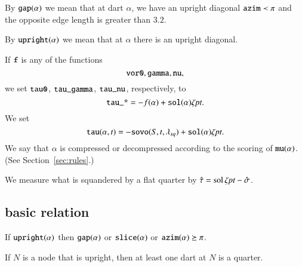 \begin{definition}[gap]
By ${\operatorname{{\texttt{gap}}}}(\alpha)$ we mean that at dart $\alpha$, we have an
upright diagonal ${\operatorname{{\texttt{azim}}}}\prec \pi$ and the opposite edge length
is greater than $3.2$.
\end{definition}

\begin{definition}[upright]
By ${\operatorname{{\texttt{upright}}}}(\alpha)$ we mean that at $\alpha$ there is an upright
diagonal.
\end{definition}


If ${\operatorname{{\texttt{f}}}}$ is any of the
functions
    $${\operatorname{{\texttt{vor0}}}},{\operatorname{{\texttt{gamma}}}}, {\operatorname{{\texttt{nu}}}},$$
we set ${\operatorname{{\texttt{tau0}}}}$, ${\operatorname{{\texttt{tau\_gamma}}}}$,
${\operatorname{{\texttt{tau\_nu}}}}$, respectively,
to
    $${\operatorname{{\texttt{tau\_*}}}} = -f(\alpha) +{\operatorname{{\texttt{sol}}}}(\alpha)\zeta\hbox{\it pt}.$$
We set
    $$
    {\operatorname{{\texttt{tau}}}}(\alpha,t) = -
    {\operatorname{{\texttt{sovo}}}}(S,t,\lambda_{sq})+{\operatorname{{\texttt{sol}}}}(\alpha)\zeta\hbox{\it pt}.
    $$
We say that $\alpha$ is compressed or decompressed 
according to the scoring of ${\operatorname{{\texttt{mu}}}}(\alpha)$.  (See
Section~\ref{sec:rules}.)

We  measure what is squandered by a flat quarter by $\hat\tau =
\operatorname{sol}\zeta\hbox{\it pt} - \hat\sigma$.


\subsection{basic relation}

\begin{lemma} If ${\operatorname{{\texttt{upright}}}}(\alpha)$ then ${\operatorname{{\texttt{gap}}}}(\alpha)$ or
${\operatorname{{\texttt{slice}}}}(\alpha)$ or ${\operatorname{{\texttt{azim}}}}(\alpha) \succeq \pi$.
\end{lemma}


\begin{lemma}  If $N$ is a node that is upright, then at least
one dart at $N$ is a quarter.
\end{lemma}



